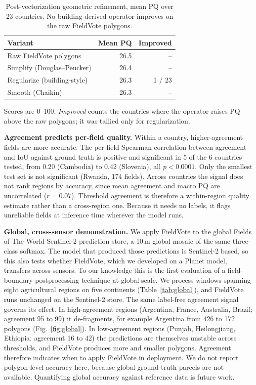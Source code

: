 \documentclass[conference]{IEEEtran}
\newcommand{\parhead}[1]{\smallskip\noindent\textbf{#1}\hspace{0.6em}}
\begin{document}
\begin{table}[t]
\centering
\caption{Post-vectorization geometric refinement, mean PQ over 23 countries. No building-derived operator improves on the raw FieldVote polygons.}
\label{tab:refine}
\begin{tabular}{@{}lrr@{}}
\toprule
Variant & Mean PQ & Improved \\
\midrule
Raw FieldVote polygons & 26.5 & -- \\
Simplify (Douglas--Peucker) & 26.4 & -- \\
Regularize (building-style) & 26.3 & 1 / 23 \\
Smooth (Chaikin) & 26.3 & -- \\
\bottomrule
\end{tabular}

\smallskip
\begin{minipage}{0.94\columnwidth}
\footnotesize Scores are 0--100. \emph{Improved} counts the countries where the operator raises PQ above the raw polygons; it was tallied only for regularization.
\end{minipage}
\end{table}

\parhead{Agreement predicts per-field quality.}
Within a country, higher-agreement fields are more accurate. The per-field Spearman correlation between agreement and IoU against ground truth is positive and significant in 5 of the 6 countries tested, from 0.20 (Cambodia) to 0.42 (Slovenia), all $p < 0.0001$. Only the smallest test set is not significant (Rwanda, 174 fields). Across countries the signal does not rank regions by accuracy, since mean agreement and macro PQ are uncorrelated ($r = 0.07$). Threshold agreement is therefore a within-region quality estimate rather than a cross-region one. Because it needs no labels, it flags unreliable fields at inference time wherever the model runs.

\parhead{Global, cross-sensor demonstration.}
\label{sec:global}
We apply FieldVote to the global Fields of The World Sentinel-2 prediction store, a 10\,m global mosaic of the same three-class softmax. The model that produced those predictions is Sentinel-2 based, so this also tests whether FieldVote, which we developed on a Planet model, transfers across sensors. To our knowledge this is the first evaluation of a field-boundary postprocessing technique at global scale. We process windows spanning eight agricultural regions on five continents (Table~\ref{tab:global}), and FieldVote runs unchanged on the Sentinel-2 store. The same label-free agreement signal governs its effect. In high-agreement regions (Argentina, France, Australia, Brazil; agreement 95 to 99) it de-fragments, for example Argentina from 426 to 172 polygons (Fig.~\ref{fig:global}). In low-agreement regions (Punjab, Heilongjiang, Ethiopia; agreement 16 to 42) the predictions are themselves unstable across thresholds, and FieldVote produces more and smaller polygons. Agreement therefore indicates when to apply FieldVote in deployment. We do not report polygon-level accuracy here, because global ground-truth parcels are not available. Quantifying global accuracy against reference data is future work.
\end{document}
